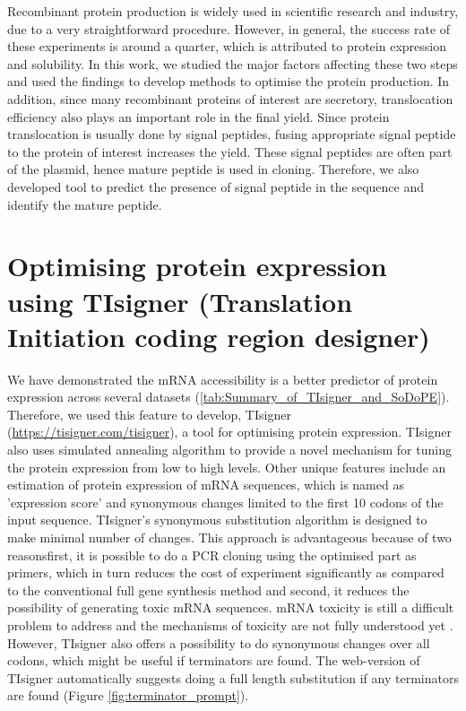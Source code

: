 Recombinant protein production is widely used in scientific research and industry, due to a very straightforward procedure. However, in general, the success rate of these experiments is around a quarter, which is attributed to protein expression and solubility. In this work, we studied the major factors affecting these two steps and used the findings to develop methods to optimise the protein production. In addition, since many recombinant proteins of interest are secretory, translocation efficiency also plays an important role in the final yield. Since protein translocation is usually done by signal peptides, fusing appropriate signal peptide to the protein of interest increases the yield. These signal peptides are often part of the plasmid, hence mature peptide is used in cloning. Therefore, we also developed tool to predict the presence of signal peptide in the sequence and identify the mature peptide. 

\section{Optimising protein expression using TIsigner (Translation Initiation coding region designer)}
We have demonstrated the mRNA accessibility is a better predictor of protein expression across several datasets (\ref{tab:Summary_of_TIsigner_and_SoDoPE}). Therefore, we used this feature to develop, TIsigner (\href{https://tisigner.com/tisigner}{https://tisigner.com/tisigner}), a tool for optimising protein expression. TIsigner also uses simulated annealing algorithm to provide a novel mechanism for tuning the protein expression from low to high levels. Other unique features include an estimation of protein expression of mRNA sequences, which is named as 'expression score' and synonymous changes limited to the first 10 codons of the input sequence. TIsigner's synonymous substitution algorithm is designed to make minimal number of changes. This approach is advantageous because of two reasons\textemdash first, it is possible to do a PCR cloning using the optimised part as primers, which in turn reduces the cost of experiment significantly as compared to the conventional full gene synthesis method and second, it reduces the possibility of generating toxic mRNA sequences. mRNA toxicity is still a difficult problem to address and the mechanisms of toxicity are not fully understood yet \cite{mittal2018codon}. However, TIsigner also offers a possibility to do synonymous changes over all codons, which might be useful if terminators are found. The web-version of TIsigner automatically suggests doing a full length substitution if any terminators are found (Figure \ref{fig:terminator_prompt}).

